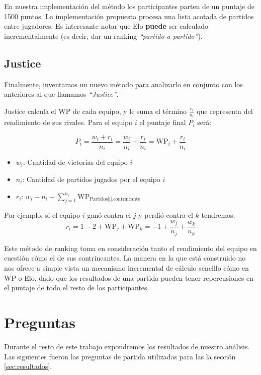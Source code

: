 \documentclass[a4paper]{article}
\begin{document}
En nuestra implementación del método los participantes parten de un puntaje de 1500 puntos. La implementación propuesta procesa una lista acotada de partidos entre jugadores. Es interesante notar que Elo \textbf{puede} ser calculado incrementalmente (es decir, dar un ranking \textit{``partido a partido''}).

\subsection{Justice}

Finalmente, inventamos un nuevo método para analizarlo en conjunto con los anteriores al que llamamos \textit{``Justice''}.

Justice calcula el WP de cada equipo, y le suma el término $\frac{r_i}{n_i}$ que representa del rendimiento de sus rivales. Para el equipo $i$ el puntaje final $P_i$ será:

\begin{equation}
    P_i = \frac{w_i + r_i}{n_i}
        = \frac{w_i}{n_i} + \frac{r_i}{n_i}
        = \text{WP}_i + \frac{r_i}{n_i}
    \label{eq:Justice-Pi}
\end{equation}

\begin{itemize}
    \item $w_i$: Cantidad de victorias del equipo $i$
    \item $n_i$: Cantidad de partidos jugados por el equipo $i$
    \item $r_i$: $w_i - n_i + \sum_{j=1}^{n_i} \text{WP}_\text{Partidos[i].contrincante}$
\end{itemize}

Por ejemplo, si el equipo $i$ ganó contra el $j$ y perdió contra el $k$ tendremos:
\[
    r_i = 1 - 2 + \text{WP}_j + \text{WP}_k
        = -1 + \frac{w_j}{n_j} + \frac{w_k}{n_k}
\]

Este método de ranking toma en consideración tanto el rendimiento del equipo en cuestión cómo el de sus contrincantes. La manera en la que está construido no nos ofrece a simple vista un mecanismo incremental de cálculo sencillo cómo en WP o Elo, dado que los resultados de una partida pueden tener repercusiones en el puntaje de todo el resto de los participantes.

\section{Preguntas} \label{sec:preguntas}

Durante el resto de este trabajo expondremos los resultados de nuestro análisis. Las siguientes fueron las preguntas de partida utilizadas para las la sección \ref{sec:resultados}.
\end{document}
